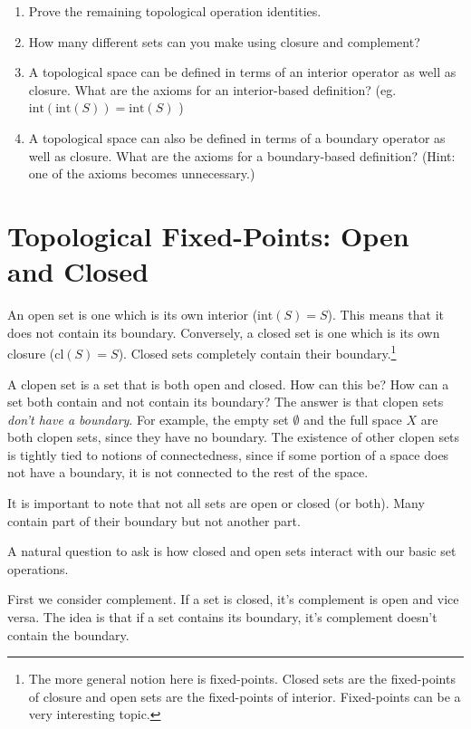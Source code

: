 \documentclass{report}
\newcommand{\cl}{\mathrm{cl}}
\newcommand{\intr}{\mathrm{int}}
\begin{document}
\begin{enumerate}

\item Prove the remaining topological operation identities.

\item How many different sets can you make using closure and complement?

\item A topological space can be defined in terms of an interior operator as well as closure. What are the axioms for an interior-based definition? (eg. $\intr(\intr(S)) = \intr(S)$ )

\item A topological space can also be defined in terms of a boundary operator as well as closure. What are the axioms for a boundary-based definition? (Hint: one of the axioms becomes unnecessary.)

\end{enumerate}

\section{Topological Fixed-Points: Open and Closed}

An open set is one which is its own interior ($\intr(S) = S$). This means that it does not contain its boundary. Conversely, a closed set is one which is its own closure ($\cl(S) = S$). Closed sets completely contain their boundary.\footnote{The more general notion here is fixed-points. Closed sets are the fixed-points of closure and open sets are the fixed-points of interior. Fixed-points can be a very interesting topic.}

A clopen set is a set that is both open and closed. How can this be? How can a set both contain and not contain its boundary? The answer is that clopen sets \emph{don't have a boundary}. For example, the empty set $∅$ and the full space $X$ are both clopen sets, since they have no boundary. The existence of other clopen sets is tightly tied to notions of connectedness, since if some portion of a space does not have a boundary, it is not connected to the rest of the space.

It is important to note that not all sets are open or closed (or both). Many contain part of their boundary but not another part.

A natural question to ask is how closed and open sets interact with our basic set operations.

First we consider complement. If a set is closed, it's complement is open and vice versa. The idea is that if a set contains its boundary, it's complement doesn't contain the boundary.
\end{document}
